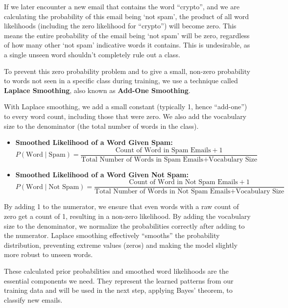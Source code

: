 \documentclass[12pt,letterpaper]{article}
\begin{document}
If we later encounter a new email that contains the word ``crypto'', and we are calculating the probability of this email being `not spam', the product of all word likelihoods (including the zero likelihood for ``crypto'') will become zero. This means the entire probability of the email being `not spam' will be zero, regardless of how many other `not spam' indicative words it contains. This is undesirable, as a single unseen word shouldn't completely rule out a class.

To prevent this zero probability problem and to give a small, non-zero probability to words not seen in a specific class during training, we use a technique called \textbf{Laplace Smoothing}, also known as \textbf{Add-One Smoothing}.

With Laplace smoothing, we add a small constant (typically 1, hence ``add-one'') to every word count, including those that were zero. We also add the vocabulary size to the denominator (the total number of words in the class).

\begin{itemize}
    \item \textbf{Smoothed Likelihood of a Word Given Spam:}
    \begin{equation}
    P(\text{Word} \mid \text{Spam}) = \frac{\text{Count of Word in Spam Emails} + 1}{\text{Total Number of Words in Spam Emails} + \text{Vocabulary Size}}
    \end{equation}
    
    \item \textbf{Smoothed Likelihood of a Word Given Not Spam:}
    \begin{equation}
    P(\text{Word} \mid \text{Not Spam}) = \frac{\text{Count of Word in Not Spam Emails} + 1}{\text{Total Number of Words in Not Spam Emails} + \text{Vocabulary Size}}
    \end{equation}
\end{itemize}

By adding 1 to the numerator, we ensure that even words with a raw count of zero get a count of 1, resulting in a non-zero likelihood. By adding the vocabulary size to the denominator, we normalize the probabilities correctly after adding to the numerator. Laplace smoothing effectively ``smooths'' the probability distribution, preventing extreme values (zeros) and making the model slightly more robust to unseen words.

These calculated prior probabilities and smoothed word likelihoods are the essential components we need. They represent the learned patterns from our training data and will be used in the next step, applying Bayes' theorem, to classify new emails.
\end{document}
